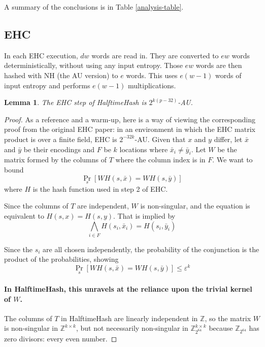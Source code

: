 \documentclass[sigconf, nonacm]{acmart}
\newtheorem*{lemma}{Lemma}
\newcommand{\ints}{\mathbb{Z}}
\begin{document}
A summary of the conclusions is in Table \ref{analysis-table}.

\subsection{EHC}

In each EHC execution, $dw$ words are read in.
They are converted to $ew$ words deterministically, without using any input entropy.
Those $ew$ words are then hashed with NH (the AU version) to $e$ words.
This uses $e(w - 1)$ words of input entropy and performs $e(w - 1)$ multiplications.

\begin{lemma}
  The EHC step of HalftimeHash is $2^{k(p-32)}$-AU.
\end{lemma}

\begin{proof}
As a reference and a warm-up, here is a way of viewing the corresponding proof from the original EHC paper:
in an environment in which the EHC matrix product is over a finite field, EHC is $2^{-32k}$-AU.
Given that $x$ and $y$ differ, let $\bar{x}$ and $\bar{y}$ be their encodings and $F$ be $k$ locations where $\bar{x}_i \neq \bar{y}_i$.
Let $W$ be the matrix formed by the columns of $T$ where the column index is in $F$.
We want to bound
\begin{equation}
  \label{ehc-delta}
  \Pr_s[W  H(s,\bar{x}) = W H(s,\bar{y})]
\end{equation}
where $H$ is the hash function used in step 2 of EHC.

Since the columns of $T$ are independent, $W$ is non-singular, and the equation is equivalent to $H(s,x) = H(s,y)$.
That is implied by
\[
\bigwedge_{i \in F} H(s_i, \bar{x}_i) = H(s_i, \bar{y}_i)
\]

Since the $s_i$ are all chosen independently, the probability of the conjunction is the product of the probabilities, showing
\[
\Pr_s[W H(s,\bar{x}) = W H(s,\bar{y})] \leq \varepsilon^k
\]

\paragraph{In HalftimeHash, this unravels at the reliance upon the trivial kernel of $W$.}

The columns of $T$ in HalftimeHash are linearly independent in $\ints$, so the matrix $W$ is non-singular in $\ints^{k\times{}k}$, but not necessarily non-singular in $\ints_{2^{64}}^{k\times{}k}$ because $\ints_{2^{64}}$ has zero divisors: every even number.


\end{proof}
\end{document}
